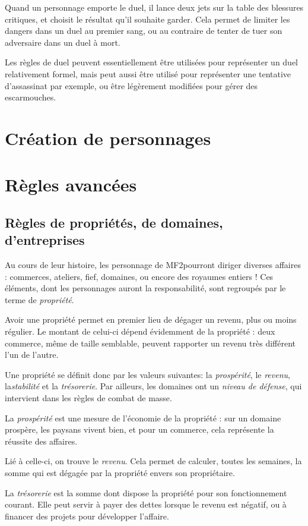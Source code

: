 \documentclass[10pt,a4paper]{book}
\newcommand{\titre}{MF2}
\begin{document}
Quand un personnage emporte le duel, il lance deux jets sur la table des blessures critiques, et choisit le résultat qu'il souhaite garder. Cela permet de limiter les dangers dans un duel au premier sang, ou au contraire de tenter de tuer son adversaire dans un duel à mort.

Les règles de duel peuvent essentiellement être utilisées pour représenter un duel relativement formel, mais peut aussi être utilisé pour représenter une tentative d'assassinat par exemple, ou être légèrement modifiées pour gérer des escarmouches.
\chapter{Création de personnages}

\chapter{Règles avancées}
\section{Règles de propriétés, de domaines, d'entreprises}
Au cours de leur histoire, les personnage de \titre pourront diriger diverses affaires : commerces, ateliers, fief, domaines, ou encore des royaumes entiers ! Ces éléments, dont les personnages auront la responsabilité, sont regroupés par le terme de \emph{propriété}. 

Avoir une propriété permet en premier lieu de dégager un revenu, plus ou moins régulier. Le montant de celui-ci dépend évidemment de la propriété : deux commerce, même de taille semblable, peuvent rapporter un revenu très différent l'un de l'autre.

Une propriété se définit donc par les valeurs suivantes: la \emph{prospérité}, le \emph{revenu}, la\emph{stabilité} et la \emph{trésorerie}. Par ailleurs, les domaines ont un \emph{niveau de défense}, qui intervient dans les règles de combat de masse.

La \emph{prospérité} est une mesure de l'économie de la propriété : sur un domaine prospère, les paysans vivent bien, et pour un commerce, cela représente la réussite des affaires.

Lié à celle-ci, on trouve le \emph{revenu}. Cela permet de calculer, toutes les semaines, la somme qui est dégagée par la propriété envers son propriétaire. 

La \emph{trésorerie} est la somme dont dispose la propriété pour son fonctionnement courant. Elle peut servir à payer des dettes lorsque le revenu est négatif, ou à financer des projets pour développer l'affaire. 
\end{document}

